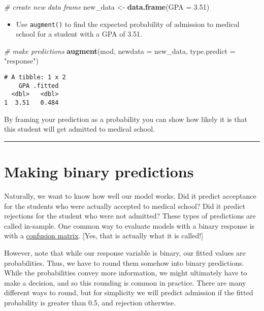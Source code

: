 \documentclass[
]{book}
\newenvironment{Shaded}{\begin{snugshade}}{\end{snugshade}}
\newcommand{\CommentTok}[1]{\textcolor[rgb]{0.56,0.35,0.01}{\textit{#1}}}
\newcommand{\DataTypeTok}[1]{\textcolor[rgb]{0.13,0.29,0.53}{#1}}
\newcommand{\FloatTok}[1]{\textcolor[rgb]{0.00,0.00,0.81}{#1}}
\newcommand{\KeywordTok}[1]{\textcolor[rgb]{0.13,0.29,0.53}{\textbf{#1}}}
\newcommand{\NormalTok}[1]{#1}
\newcommand{\StringTok}[1]{\textcolor[rgb]{0.31,0.60,0.02}{#1}}
\providecommand{\tightlist}{%
  \setlength{\itemsep}{0pt}\setlength{\parskip}{0pt}}
\begin{document}
\begin{Shaded}
\begin{Highlighting}[]
\CommentTok{# create new data frame}
\NormalTok{new_data <-}\StringTok{ }\KeywordTok{data.frame}\NormalTok{(}\DataTypeTok{GPA =} \FloatTok{3.51}\NormalTok{)}
\end{Highlighting}
\end{Shaded}

\begin{itemize}
\tightlist
\item
  Use \texttt{augment()} to find the expected probability of admission to medical school for a student with a GPA of 3.51.
\end{itemize}

\begin{Shaded}
\begin{Highlighting}[]
\CommentTok{# make predictions}
\KeywordTok{augment}\NormalTok{(mod, }\DataTypeTok{newdata =}\NormalTok{ new_data, }\DataTypeTok{type.predict =} \StringTok{"response"}\NormalTok{)}
\end{Highlighting}
\end{Shaded}

\begin{verbatim}
# A tibble: 1 x 2
    GPA .fitted
  <dbl>   <dbl>
1  3.51   0.484
\end{verbatim}

By framing your prediction as a probability you can show how likely it is that this student will get admitted to medical school.

\begin{center}\rule{0.5\linewidth}{0.5pt}\end{center}

\hypertarget{making-binary-predictions}{%
\section{Making binary predictions}\label{making-binary-predictions}}

Naturally, we want to know how well our model works. Did it predict acceptance for the students who were actually accepted to medical school? Did it predict rejections for the student who were not admitted? These types of predictions are called in-sample. One common way to evaluate models with a binary response is with a \href{https://en.wikipedia.org/wiki/Confusion_matrix}{confusion matrix}. {[}Yes, that is actually what it is called!{]}

However, note that while our response variable is binary, our fitted values are probabilities. Thus, we have to round them somehow into binary predictions. While the probabilities convey more information, we might ultimately have to make a decision, and so this rounding is common in practice. There are many different ways to round, but for simplicity we will predict admission if the fitted probability is greater than 0.5, and rejection otherwise.
\end{document}
